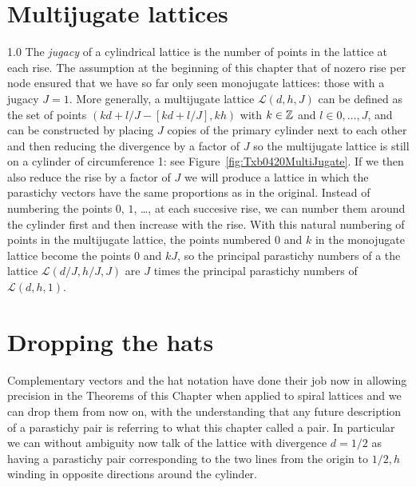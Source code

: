  \section{Multijugate lattices}
{1.0}
 The \textit{jugacy} of a cylindrical lattice is the number of points in the lattice at each rise. The assumption at the beginning of this chapter that of nozero rise per node ensured that we  have so far only seen  monojugate lattices: those with a jugacy $J=1$. More generally, a multijugate lattice $\mathcal{L}(d,h,J)$ can be defined as the set of points 
 $ (kd+ l/J - [kd+ l/J],kh)$ with $ k\in\mathbb{Z}$ and $l\in  0,\ldots,J$,
 and can be constructed by placing $J$ copies of the primary cylinder next to each other and then reducing the divergence by a factor of $J$ so the multijugate lattice is still on a cylinder of circumference 1: see Figure~\ref{fig:Txb0420MultiJugate}. If we then also reduce the rise by a factor of $J$ we will produce a lattice in which the parastichy vectors have the same proportions  as in the original. Instead of numbering the points $0$, $1$, \ldots, at each succesive rise, we can number them around the cylinder first and then increase with the rise. 
 With this natural numbering of points in the multijugate lattice, the points numbered $0$ and $k$ in the monojugate lattice become the points $0$ and $kJ$, so the principal parastichy numbers of a the lattice $\mathcal{L}(d/J,h/J,J)$ are $J$ times the principal parastichy numbers of $\mathcal{L}(d,h,1)$. 
 
% 
 \section{Dropping the hats}
 Complementary vectors and the hat notation have done their job now in allowing precision in  the Theorems of this Chapter when applied to spiral lattices and we can drop them from now on, with the understanding that any future description of a  parastichy pair is referring to what this chapter called a  pair. In particular we can  without ambiguity now talk of the lattice with divergence $d=1/2$ as having a   parastichy pair corresponding to the two lines from the origin to ${1/2,h}$ winding in opposite directions around the cylinder. 

